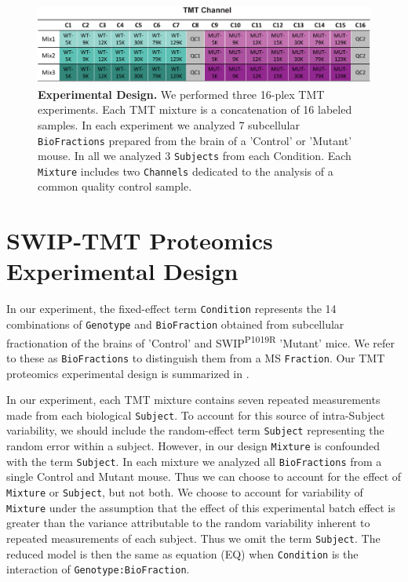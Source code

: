 \documentclass[11pt]{elife}\usepackage[]{graphicx}\usepackage[]{color}
\begin{document}
\begin{figure}[hb!] %
  \begin{fullwidth}
  \begin{center}
	  \includegraphics[width=0.9\paperwidth,keepaspectratio]{design}
	  \caption{\textbf{Experimental Design.} We performed three 16-plex TMT
	  experiments. Each TMT mixture is a concatenation of 16 labeled
	  samples. In each experiment we analyzed 7 subcellular
	  \texttt{BioFractions} prepared from the brain of a 'Control' or
	  'Mutant' mouse. In all we analyzed 3 \texttt{Subjects} from each 
	  {Condition}. Each \texttt{Mixture} includes two \texttt{Channels}
	  dedicated to the analysis of a common quality control sample.}
	  \label{fig:design}
  \end{center}
  \end{fullwidth}
\end{figure}


\section{SWIP-TMT Proteomics Experimental Design}

In our experiment, the fixed-effect term \texttt{Condition} represents the 14
combinations of \texttt{Genotype} and \texttt{BioFraction} obtained from 
subcellular fractionation of the brains of 'Control' and 
SWIP\textsuperscript{P1019R} 'Mutant' mice. We refer to these as
\texttt{BioFractions} to distinguish them from a MS \texttt{Fraction}. 
Our TMT proteomics experimental design is summarized in .

In our experiment, each TMT mixture contains seven repeated measurements
made from each biological \texttt{Subject}. To account for this source of
intra-Subject variability, we should include the random-effect term
\texttt{Subject} representing the random error within a subject. However, in our
design \texttt{Mixture} is confounded with the term \texttt{Subject}. In
each mixture we analyzed all \texttt{BioFractions} from a single Control and
Mutant mouse.  Thus we can choose to account for the effect of \texttt{Mixture}
or \texttt{Subject}, but not both. We choose to account for variability of 
\texttt{Mixture} under the assumption that the effect of this experimental batch 
effect is greater than the variance attributable to the random variability
inherent to repeated measurements of each subject. 
Thus we omit the term \texttt{Subject}. The reduced model is then the same as
equation (EQ) when \texttt{Condition} is the interaction of 
\texttt{Genotype:BioFraction}.\\
\end{document}
